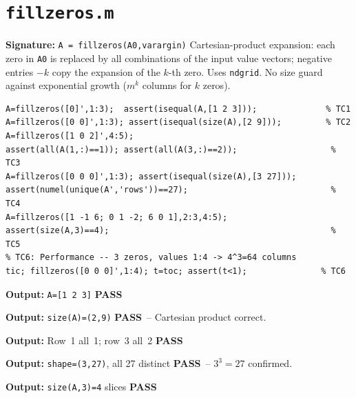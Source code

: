 \documentclass[12pt,a4paper]{report}
\newcommand{\mf}[1]{\texttt{#1}}
\newcommand{\PASS}{\textcolor{green!60!black}{\textbf{PASS}}}
\begin{document}
\chapter{\mf{fillzeros.m}}
\begin{tcolorbox}[Abox,title=Analysis]
\textbf{Signature:} \lstinline|A = fillzeros(A0,varargin)|\quad
Cartesian-product expansion: each zero in \mf{A0} is replaced by all combinations of the input value vectors; negative entries $-k$ copy the expansion of the $k$-th zero. Uses \mf{ndgrid}. No size guard against exponential growth ($m^k$ columns for $k$ zeros).
\end{tcolorbox}
\begin{lstlisting}[caption={Tests for fillzeros.m}]
A=fillzeros([0]',1:3);  assert(isequal(A,[1 2 3]));              % TC1
A=fillzeros([0 0]',1:3); assert(isequal(size(A),[2 9]));         % TC2
A=fillzeros([1 0 2]',4:5);
assert(all(A(1,:)==1)); assert(all(A(3,:)==2));                   % TC3
A=fillzeros([0 0 0]',1:3); assert(isequal(size(A),[3 27]));
assert(numel(unique(A','rows'))==27);                             % TC4
A=fillzeros([1 -1 6; 0 1 -2; 6 0 1],2:3,4:5);
assert(size(A,3)==4);                                             % TC5
% TC6: Performance -- 3 zeros, values 1:4 -> 4^3=64 columns
tic; fillzeros([0 0 0]',1:4); t=toc; assert(t<1);               % TC6
\end{lstlisting}
\begin{tcolorbox}[Pbox,title=TC1 -- Single zero, 3 values]
\textbf{Output:} \texttt{A=[1 2 3]} \quad \PASS
\end{tcolorbox}
\begin{tcolorbox}[Pbox,title=TC2 -- Two zeros, $3\times3=9$ columns]
\textbf{Output:} \texttt{size(A)=(2,9)} \quad \PASS\ -- Cartesian product correct.
\end{tcolorbox}
\begin{tcolorbox}[Pbox,title=TC3 -- Non-zero entries preserved]
\textbf{Output:} Row~1 all~1; row~3 all~2 \quad \PASS
\end{tcolorbox}
\begin{tcolorbox}[Pbox,title=TC4 -- All 27 endomaps of $\{1,2,3\}$]
\textbf{Output:} \texttt{shape=(3,27)}, all 27 distinct \quad \PASS\ -- $3^3=27$ confirmed.
\end{tcolorbox}
\begin{tcolorbox}[Pbox,title=TC5 -- Negative markers (copy references)]
\textbf{Output:} \texttt{size(A,3)=4} slices \quad \PASS
\end{tcolorbox}
\end{document}
